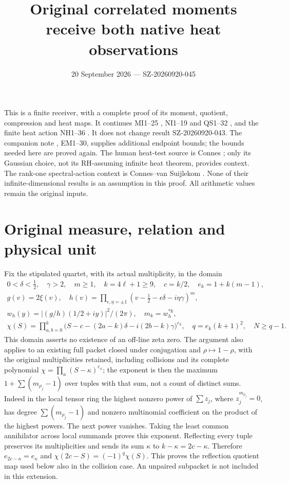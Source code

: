 \documentclass[11pt]{article}
\title{Original correlated moments receive both native heat observations}
\author{}\date{20 September 2026 --- SZ-20260920-045}
\begin{document}
\maketitle

This is a finite receiver, with a complete proof of its moment, quotient,
compression and heat maps. It continues MI1--25 \cite{MI}, NI1--19 and
QS1--32 \cite{NI}, and the finite heat action NH1--36 \cite{NH}.
It does not change result SZ-20260920-043. The companion note
, EM1--30,
supplies additional endpoint bounds; the bounds needed here are proved
again. The human heat-test source is Connes \cite{Connes}; only its
Gaussian choice, not its RH-assuming infinite heat theorem, provides
context. The rank-one spectral-action context is Connes--van Suijlekom
\cite{CV}. None of their infinite-dimensional results is an assumption
in this proof. All arithmetic values remain the original inputs.

\section{Original measure, relation and physical unit}

Fix the stipulated quartet, with its actual multiplicity, in the domain
\begin{equation}\tag{HR1}\label{HR1}
\begin{gathered}
0<\delta<\tfrac12,\quad\gamma>2,\quad m\ge1,\quad
k=4\ell+1\ge9,\quad c=k/2,\quad e_k=1+k(m-1),\\
g(v)=2\xi(v),\quad h(v)=\prod_{\epsilon,\eta=\pm1}
(v-\tfrac12-\epsilon\delta-i\eta\gamma)^m,\\
w_h(y)=|(g/h)(1/2+iy)|^2/(2\pi),\quad m_k=w_h^{*k},\\
\chi(S)=\prod_{a,b=0}^k
\bigl(S-c-(2a-k)\delta-i(2b-k)\gamma\bigr)^{e_k},\quad
q=e_k(k+1)^2,\quad N\ge q-1.
\end{gathered}
\end{equation}
This domain asserts no existence of an off-line zeta zero. The argument
also applies to an existing full packet closed under conjugation and
\(\rho\mapsto1-\rho\), with the original multiplicities retained,
including collisions and its complete polynomial
\(\chi=\prod_\kappa(S-\kappa)^{e_\kappa}\); the exponent is then the
maximum \(1+\sum(m_{\rho_j}-1)\) over tuples with that sum, not a count
of distinct sums. Indeed in the local tensor ring the highest nonzero
power of \(\sum z_j\), where \(z_j^{m_{\rho_j}}=0\), has degree
\(\sum(m_{\rho_j}-1)\) and nonzero multinomial coefficient on the
product of the highest powers. The next power vanishes. Taking the
least common annihilator across local summands proves this exponent.
Reflecting every tuple preserves its multiplicities and sends its sum
\(\kappa\) to \(k-\kappa=2c-\kappa\). Therefore
\(e_{2c-\kappa}=e_\kappa\) and
\(\chi(2c-S)=(-1)^q\chi(S)\). This proves the reflection quotient
map used below also in the collision case. An unpaired subpacket is
not included in this extension.
\end{document}
